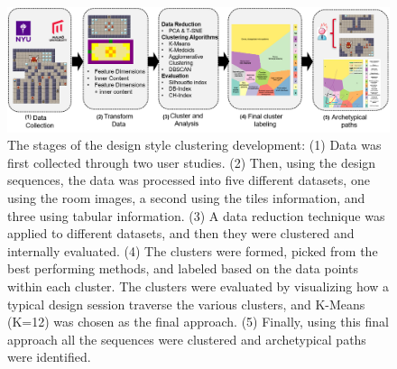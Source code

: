 
\begin{figure}[ht!]
\centerline{\includegraphics[width=\textwidth]{figures/figure1.png}}
\caption{The stages of the design style clustering development: (1) Data was first collected through two user studies. (2) Then, using the design sequences, the data was processed into five different datasets, one using the room images, a second using the tiles information, and three using tabular information. (3) A data reduction technique was applied to different datasets, and then they were clustered and internally evaluated. (4) The clusters were formed, picked from the best performing methods, and labeled based on the data points within each cluster. The clusters were evaluated by visualizing how a typical design session traverse the various clusters, and K-Means (K=12) was chosen as the final approach. (5) Finally, using this final approach all the sequences were clustered and archetypical paths were identified.%
} \label{fig:approach-steps}
\end{figure}